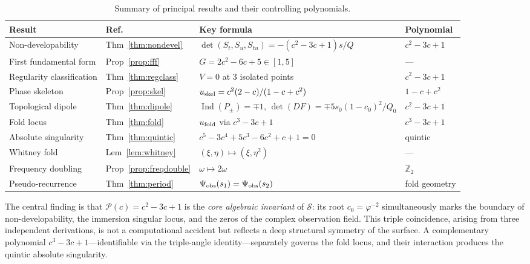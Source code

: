 \documentclass[12pt]{article}
\DeclareMathOperator{\Ind}{Ind}
\begin{document}
\begin{table}[ht]
\small\centering
\caption{Summary of principal results and their controlling polynomials.}
\label{tab:summary}
\begin{tabular}{@{}llp{3.9cm}l@{}}
\toprule
Result & Ref.\ & Key formula & Polynomial \\
\midrule
Non-developability        & Thm~\ref{thm:nondevel}
  & $\det(S_t,S_u,S_{tu})=-(c^2\!-\!3c\!+\!1)s/Q$
  & $c^2-3c+1$ \\
First fundamental form    & Prop~\ref{prop:fff}
  & $G=2c^2-6c+5\in[1,5]$
  & --- \\
Regularity classification & Thm~\ref{thm:regclass}
  & $V=0$ at 3 isolated points
  & $c^2-3c+1$ \\
Phase skeleton            & Prop~\ref{prop:skel}
  & $u_{\rm skel}=c^2(2-c)/(1-c+c^2)$
  & $1-c+c^2$ \\
Topological dipole        & Thm~\ref{thm:dipole}
  & $\Ind(P_\pm)=\mp1$, $\det(DF)=\mp5s_0(1-c_0)^2/Q_0$
  & $c^2-3c+1$ \\
Fold locus                & Thm~\ref{thm:fold}
  & $u_{\rm fold}$ via $c^3\!-\!3c\!+\!1$
  & $c^3-3c+1$ \\
Absolute singularity      & Thm~\ref{thm:quintic}
  & $c^5-3c^4+5c^3-6c^2+c+1=0$
  & quintic \\
Whitney fold              & Lem~\ref{lem:whitney}
  & $(\xi,\eta)\mapsto(\xi,\eta^2)$
  & --- \\
Frequency doubling        & Prop~\ref{prop:freqdouble}
  & $\omega\mapsto2\omega$
  & $\mathbb{Z}_2$ \\
Pseudo-recurrence         & Thm~\ref{thm:period}
  & $\Psi_{\rm obs}(s_1)=\Psi_{\rm obs}(s_2)$
  & fold geometry \\
\bottomrule
\end{tabular}
\end{table}

The central finding is that $\mathcal{P}(c)=c^2-3c+1$ is the
\emph{core algebraic invariant} of $\mathcal{S}$: its root
$c_0=\varphi^{-2}$ simultaneously marks the boundary of
non-developability, the immersion singular locus, and the zeros of the
complex observation field.
This triple coincidence, arising from three independent derivations,
is not a computational accident but reflects a deep structural
symmetry of the surface.
A complementary polynomial $c^3-3c+1$---identifiable via the triple-angle
identity---separately governs the fold locus, and their interaction
produces the quintic absolute singularity.
\end{document}

